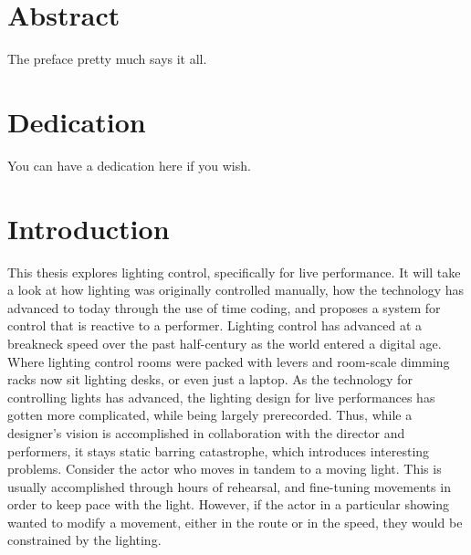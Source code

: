 \documentclass[12pt,twoside]{reedthesis}
\begin{document}
    \chapter*{Abstract}
	The preface pretty much says it all.
	
	\chapter*{Dedication}
	You can have a dedication here if you wish.

  \mainmatter %
  \pagestyle{fancyplain} %


    \chapter*{Introduction}

 \doublespacing
	
This thesis explores lighting control, specifically for live performance. It will take a look at how lighting was originally controlled manually, how the technology has advanced to today through the use of time coding, and proposes a system for control that is reactive to a performer. Lighting control has advanced at a breakneck speed over the past half-century as the world entered a digital age. Where lighting control rooms were packed with levers and room-scale dimming racks now sit lighting desks, or even just a laptop. As the technology for controlling lights has advanced, the lighting design for live performances has gotten more complicated, while being largely prerecorded. Thus, while a designer's vision is accomplished in collaboration with the director and performers, it stays static barring catastrophe, which introduces interesting problems. Consider the actor who moves in tandem to a moving light. This is usually accomplished through hours of rehearsal, and fine-tuning movements in order to keep pace with the light. However, if the actor in a particular showing wanted to modify a movement, either in the route or in the speed, they would be constrained by the lighting.
\end{document}
